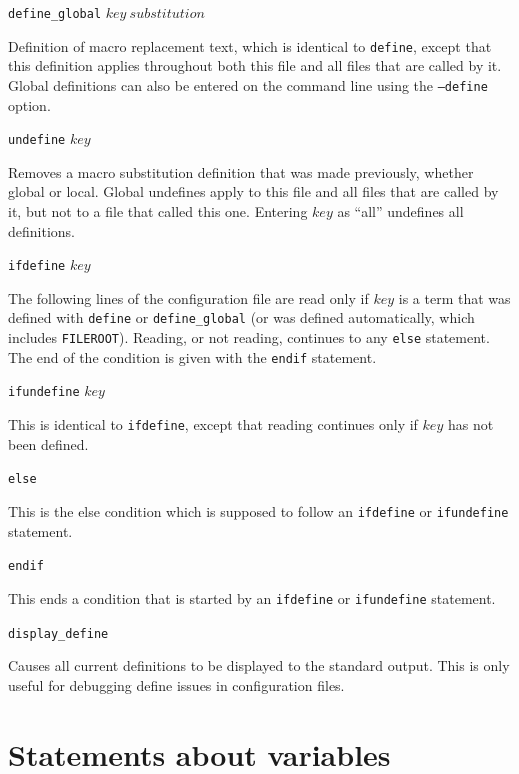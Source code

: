 \documentclass {scrbook}
\newcommand {\ttt} {\texttt}
\begin{document}
\begin{description}
\item{\ttt{define\_global} $key\ substitution$}

Definition of macro replacement text, which is identical to \ttt{define}, except that this definition applies throughout both this file and all files that are called by it. Global definitions can also be entered on the command line using the \ttt{--define} option.

\item{\ttt{undefine} $key$}

Removes a macro substitution definition that was made previously, whether global or local. Global undefines apply to this file and all files that are called by it, but not to a file that called this one. Entering $key$ as ``all'' undefines all definitions.

\item{\ttt{ifdefine} $key$}

The following lines of the configuration file are read only if $key$ is a term that was defined with \ttt{define} or \ttt{define\_global} (or was defined automatically, which includes \ttt{FILEROOT}). Reading, or not reading, continues to any \ttt{else} statement. The end of the condition is given with the \ttt{endif} statement.

\item{\ttt{ifundefine} $key$}

This is identical to \ttt{ifdefine}, except that reading continues only if $key$ has not been defined.

\item{\ttt{else}}

This is the else condition which is supposed to follow an \ttt{ifdefine} or \ttt{ifundefine} statement.

\item{\ttt{endif}}

This ends a condition that is started by an \ttt{ifdefine} or \ttt{ifundefine} statement.

\item{\ttt{display\_define}}

Causes all current definitions to be displayed to the standard output. This is only useful for debugging define issues in configuration files.

\end{description}

\section{Statements about variables}
\end{document}
